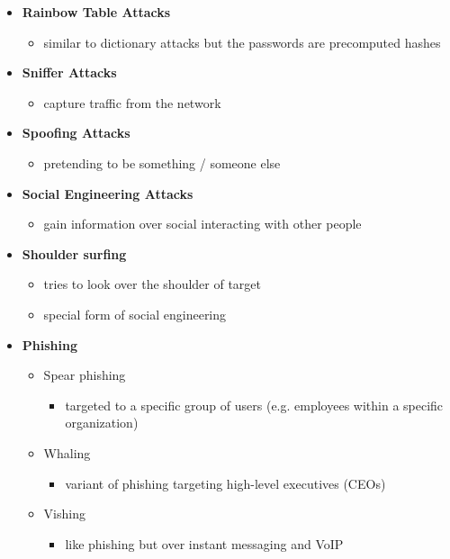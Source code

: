 \documentclass[11pt,twoside,landscape]{article}
\begin{document}
\begin{multicols}{4}
\begin{itemize}
\item \textbf{Rainbow Table Attacks}
\begin{itemize}
\item similar to dictionary attacks but the passwords are precomputed hashes
\end{itemize}

\item \textbf{Sniffer Attacks}
\begin{itemize}
\item capture traffic from the network
\end{itemize}

\item \textbf{Spoofing Attacks}
\begin{itemize}
\item pretending to be something / someone else
\end{itemize}

\item \textbf{Social Engineering Attacks}
\begin{itemize}
\item gain information over social interacting with other people
\end{itemize}

\item \textbf{Shoulder surfing}
\begin{itemize}
\item tries to look over the shoulder of target
\item special form of social engineering
\end{itemize}

\item \textbf{Phishing}
\begin{itemize}
\item Spear phishing
\begin{itemize}
\item targeted to a specific group of users (e.g. employees within a specific organization)
\end{itemize}

\item Whaling
\begin{itemize}
\item variant of phishing targeting high-level executives (CEOs)
\end{itemize}

\item Vishing
\begin{itemize}
\item like phishing but over instant messaging and VoIP
\end{itemize}
\end{itemize}
\end{itemize}


\end{multicols}
\end{document}
